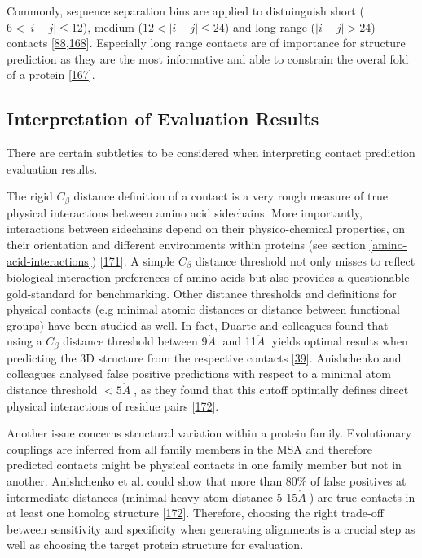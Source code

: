 \documentclass[11pt,a4paper,twoside]{book}
\newcommand{\Cb}{C_\beta}
\newcommand{\angstrom}{\mathring{A} \;}
\theoremstyle{definition}
\theoremstyle{definition}
\theoremstyle{remark}
\begin{document}
Commonly, sequence separation bins are applied to distuinguish short
(\(6 < |i-j| \le 12\)), medium (\(12 < |i-j| \le 24\)) and long range
(\(|i-j| > 24\)) contacts
{[}\protect\hyperlink{ref-Monastyrskyy2015}{88},\protect\hyperlink{ref-Monastyrskyy2014a}{168}{]}.
Especially long range contacts are of importance for structure
prediction as they are the most informative and able to constrain the
overal fold of a protein
{[}\protect\hyperlink{ref-Monastyrskyy2011}{167}{]}.

\subsection{Interpretation of Evaluation
Results}\label{interpretation-of-evaluation-results}

There are certain subtleties to be considered when interpreting contact
prediction evaluation results.

The rigid \(\Cb\) distance definition of a contact is a very rough
measure of true physical interactions between amino acid sidechains.
More importantly, interactions between sidechains depend on their
physico-chemical properties, on their orientation and different
environments within proteins (see section \ref{amino-acid-interactions})
{[}\protect\hyperlink{ref-Bettsa}{171}{]}. A simple \(\Cb\) distance
threshold not only misses to reflect biological interaction preferences
of amino acids but also provides a questionable gold-standard for
benchmarking. Other distance thresholds and definitions for physical
contacts (e.g minimal atomic distances or distance between functional
groups) have been studied as well. In fact, Duarte and colleagues found
that using a \(\Cb\) distance threshold between 9\(\angstrom\) and
11\(\angstrom\) yields optimal results when predicting the 3D structure
from the respective contacts
{[}\protect\hyperlink{ref-Duarte2010}{39}{]}. Anishchenko and colleagues
analysed false positive predictions with respect to a minimal atom
distance threshold \(< 5 \angstrom\), as they found that this cutoff
optimally defines direct physical interactions of residue pairs
{[}\protect\hyperlink{ref-Anishchenko2017}{172}{]}.

Another issue concerns structural variation within a protein family.
Evolutionary couplings are inferred from all family members in the
\protect\hyperlink{abbrev}{MSA} and therefore predicted contacts might
be physical contacts in one family member but not in another.
Anishchenko et al. could show that more than \(80\%\) of false positives
at intermediate distances (minimal heavy atom distance
5-15\(\angstrom\)) are true contacts in at least one homolog structure
{[}\protect\hyperlink{ref-Anishchenko2017}{172}{]}. Therefore, choosing
the right trade-off between sensitivity and specificity when generating
alignments is a crucial step as well as choosing the target protein
structure for evaluation.
\end{document}
